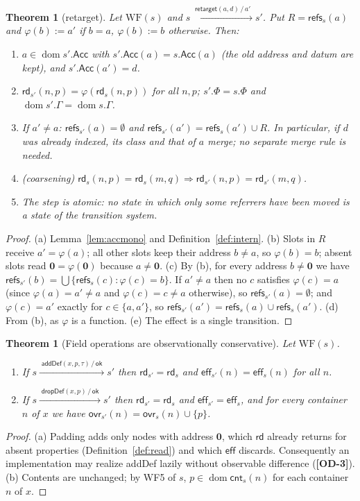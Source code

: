 \documentclass[11pt,a4paper]{article}
\theoremstyle{definition}
\theoremstyle{plain}
\newtheorem{theorem}[definition]{Theorem}
\theoremstyle{remark}
\newcommand{\od}[1]{\textsf{\textbf{\textcolor{BrickRed}{[OD-#1]}}}}
\newcommand{\nul}{\mathbf{0}}
\newcommand{\ok}{\mathsf{ok}}
\newcommand{\dom}{\operatorname{dom}}
\newcommand{\rd}{\mathsf{rd}}
\newcommand{\eff}{\mathsf{eff}}
\newcommand{\cnt}{\mathsf{cnt}}
\newcommand{\ovr}{\mathsf{ovr}}
\newcommand{\refs}{\mathsf{refs}}
\newcommand{\Acc}{\mathsf{Acc}}
\newcommand{\tr}[2]{\xrightarrow{\;#1\,/\,#2\;}}
\begin{document}
\begin{theorem}[\textsf{retarget}]\label{thm:retarget}
Let $\mathrm{WF}(s)$ and $s\tr{\textsf{retarget}(a,d)}{a'}s'$. Put $R=\refs_s(a)$ and $\varphi(b):=a'$ if $b=a$, $\varphi(b):=b$ otherwise. Then:
\begin{enumerate}[label=(\alph*),leftmargin=*]
\item $a\in\dom s'.\Acc$ with $s'.\Acc(a)=s.\Acc(a)$ (the old address and datum are kept), and $s'.\Acc(a')=d$.
\item $\rd_{s'}(n,p)=\varphi(\rd_s(n,p))$ for \emph{all} $n,p$; $s'.\Phi=s.\Phi$ and $\dom s'.\Gamma=\dom s.\Gamma$.
\item If $a'\neq a$: $\refs_{s'}(a)=\emptyset$ and $\refs_{s'}(a')=\refs_s(a')\cup R$. In particular, if $d$ was already indexed, its class and that of $a$ merge; no separate merge rule is needed.
\item (coarsening) $\rd_s(n,p)=\rd_s(m,q)\Rightarrow\rd_{s'}(n,p)=\rd_{s'}(m,q)$.
\item The step is atomic: no state in which only some referrers have been moved is a state of the transition system.
\end{enumerate}
\end{theorem}
\begin{proof}
(a) Lemma~\ref{lem:accmono} and Definition~\ref{def:intern}. (b) Slots in $R$ receive $a'=\varphi(a)$; all other slots keep their address $b\neq a$, so $\varphi(b)=b$; absent slots read $\nul=\varphi(\nul)$ because $a\neq\nul$.
(c) By (b), for every address $b\neq\nul$ we have $\refs_{s'}(b)=\bigcup\{\refs_s(c) : \varphi(c)=b\}$.
If $a'\neq a$ then no $c$ satisfies $\varphi(c)=a$ (since $\varphi(a)=a'\neq a$ and $\varphi(c)=c\neq a$ otherwise), so $\refs_{s'}(a)=\emptyset$;
and $\varphi(c)=a'$ exactly for $c\in\{a,a'\}$, so $\refs_{s'}(a')=\refs_s(a)\cup\refs_s(a')$.
(d) From (b), as $\varphi$ is a function. (e) The effect is a single transition.
\end{proof}

\begin{theorem}[Field operations are observationally conservative]\label{thm:fieldops}
Let $\mathrm{WF}(s)$.
\begin{enumerate}[label=(\alph*),leftmargin=*]
\item If $s\tr{\textsf{addDef}(x,p,\tau)}{\ok}s'$ then $\rd_{s'}=\rd_s$ and
$\eff_{s'}(n)=\eff_s(n)$ for all $n$.
\item If $s\tr{\textsf{dropDef}(x,p)}{\ok}s'$ then $\rd_{s'}=\rd_s$ and $\eff_{s'}=\eff_s$, and
for every container $n$ of $x$ we have $\ovr_{s'}(n)=\ovr_s(n)\cup\{p\}$.
\end{enumerate}
\end{theorem}
\begin{proof}
(a) Padding adds only nodes with address $\nul$, which $\rd$ already returns for absent properties (Definition~\ref{def:read}) and which $\eff$ discards. Consequently an implementation may realize \textsf{addDef} lazily without observable difference (\od{3}).
(b) Contents are unchanged; by WF5 of $s$, $p\in\dom\cnt_s(n)$ for each container $n$ of $x$.
\end{proof}
\end{document}
